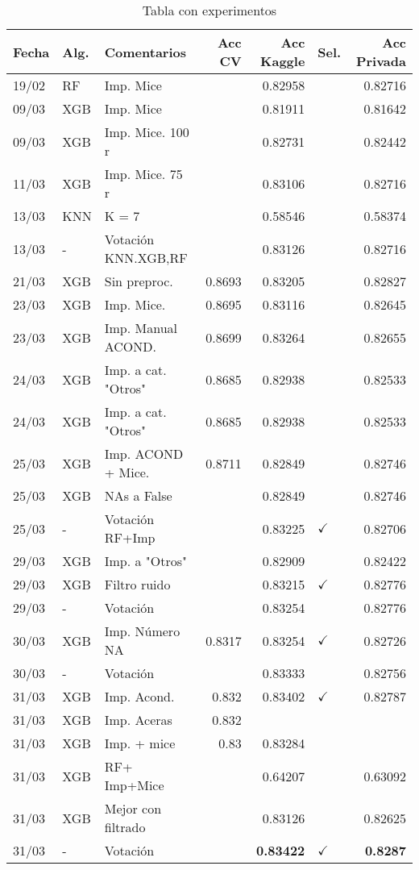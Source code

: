 \documentclass[11pt]{article}
\begin{document}
\begin{table}[htbp]
\caption{Tabla con experimentos}
\centering
\begin{tabular}{lllrrlr}
Fecha & Alg. & Comentarios & Acc CV & Acc Kaggle & Sel. & Acc Privada\\
\hline
19/02 & RF & Imp. Mice &  & 0.82958 &  & 0.82716\\
09/03 & XGB & Imp. Mice &  & 0.81911 &  & 0.81642\\
09/03 & XGB & Imp. Mice. 100 r &  & 0.82731 &  & 0.82442\\
11/03 & XGB & Imp. Mice. 75 r &  & 0.83106 &  & 0.82716\\
13/03 & KNN & K = 7 &  & 0.58546 &  & 0.58374\\
13/03 & - & Votación KNN.XGB,RF &  & 0.83126 &  & 0.82716\\
21/03 & XGB & Sin preproc. & 0.8693 & 0.83205 &  & 0.82827\\
23/03 & XGB & Imp. Mice. & 0.8695 & 0.83116 &  & 0.82645\\
23/03 & XGB & Imp. Manual ACOND. & 0.8699 & 0.83264 &  & 0.82655\\
24/03 & XGB & Imp. a cat. "Otros" & 0.8685 & 0.82938 &  & 0.82533\\
24/03 & XGB & Imp. a cat. "Otros" & 0.8685 & 0.82938 &  & 0.82533\\
25/03 & XGB & Imp. ACOND + Mice. & 0.8711 & 0.82849 &  & 0.82746\\
25/03 & XGB & NAs a False &  & 0.82849 &  & 0.82746\\
25/03 & - & Votación RF+Imp &  & 0.83225 & \(\checkmark\) & 0.82706\\
29/03 & XGB & Imp. a "Otros" &  & 0.82909 &  & 0.82422\\
29/03 & XGB & Filtro ruido &  & 0.83215 & \(\checkmark\) & 0.82776\\
29/03 & - & Votación &  & 0.83254 &  & 0.82776\\
30/03 & XGB & Imp. Número NA & 0.8317 & 0.83254 & \(\checkmark\) & 0.82726\\
30/03 & - & Votación &  & 0.83333 &  & 0.82756\\
31/03 & XGB & Imp. Acond. & 0.832 & 0.83402 & \(\checkmark\) & 0.82787\\
31/03 & XGB & Imp. Aceras & 0.832 &  &  & \\
31/03 & XGB & Imp. + mice & 0.83 & 0.83284 &  & \\
31/03 & XGB & RF+ Imp+Mice &  & 0.64207 &  & 0.63092\\
31/03 & XGB & Mejor con filtrado &  & 0.83126 &  & 0.82625\\
31/03 & - & Votación &  & \textbf{0.83422} & \(\checkmark\) & \textbf{0.8287}\\
\end{tabular}
\end{table}
\end{document}
